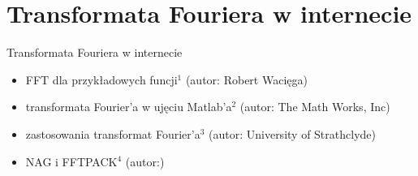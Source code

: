 \section{Transformata Fouriera w internecie}
\begin{frame}{Transformata Fouriera w internecie}
	\begin{itemize}
		\item FFT dla przykładowych funcji$^1$ (autor: Robert Wacięga) \\
		\item transformata Fourier'a w ujęciu Matlab'a$^2$ (autor: The Math Works, Inc) \\
		\item zastosowania transformat Fourier'a$^3$ (autor: University of Strathclyde) \\
		\item NAG i FFTPACK$^4$ (autor:)
	\end{itemize}
\end{frame}